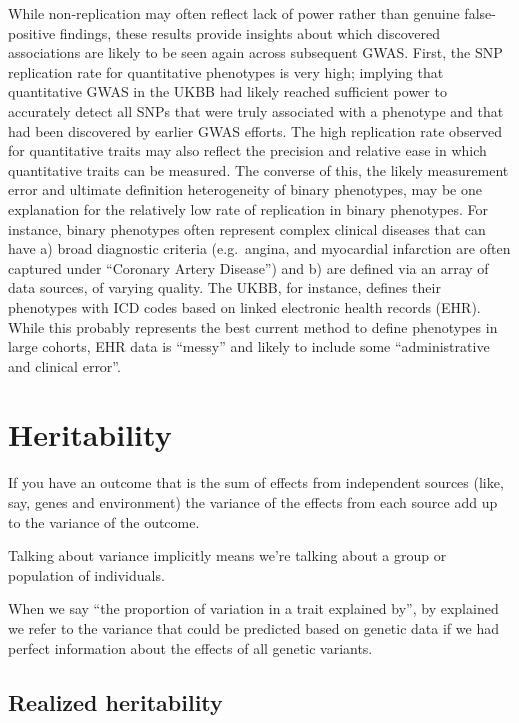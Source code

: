 \documentclass[
]{book}
\begin{document}
While non-replication may often reflect lack of power rather than genuine false-positive findings, these results provide insights about which discovered associations are likely to be seen again across subsequent GWAS. First, the SNP replication rate for quantitative phenotypes is very high; implying that quantitative GWAS in the UKBB had likely reached sufficient power to accurately detect all SNPs that were truly associated with a phenotype and that had been discovered by earlier GWAS efforts. The high replication rate observed for quantitative traits may also reflect the precision and relative ease in which quantitative traits can be measured. The converse of this, the likely measurement error and ultimate definition heterogeneity of binary phenotypes, may be one explanation for the relatively low rate of replication in binary phenotypes. For instance, binary phenotypes often represent complex clinical diseases that can have a) broad diagnostic criteria (e.g.~angina, and myocardial infarction are often captured under ``Coronary Artery Disease'') and b) are defined via an array of data sources, of varying quality. The UKBB, for instance, defines their phenotypes with ICD codes based on linked electronic health records (EHR). While this probably represents the best current method to define phenotypes in large cohorts, EHR data is ``messy'' and likely to include some ``administrative and clinical error''.

\hypertarget{heritability}{%
\chapter{Heritability}\label{heritability}}

If you have an outcome that is the sum of effects from independent sources (like, say, genes and environment) the variance of the effects from each source add up to the variance of the outcome.

Talking about variance implicitly means we're talking about a group or population of individuals.

When we say ``the proportion of variation in a trait explained by'', by explained we refer to the variance that could be predicted based on genetic data if we had perfect information about the effects of all genetic variants.

\hypertarget{realized-heritability}{%
\section{Realized heritability}\label{realized-heritability}}
\end{document}
